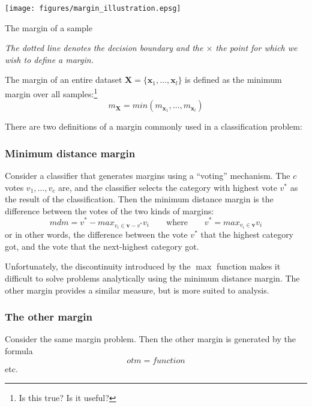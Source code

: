 \begin{linefigure}
\begin{center}
\texttt{[image: figures/margin\_illustration.epsg]}
\end{center}
\caption{The margin of a sample}
\emph{The dotted line denotes the decision boundary and the $\times$ the
point for which we wish to define a margin.}
\label{fig:margin illustration}
\end{linefigure}

The margin of an entire dataset $\mathbf{X} = \{ \mathbf{x}_1, \ldots,
\mathbf{x}_l \}$ is defined as the minimum margin over all
samples:\footnote{Is this true?  Is it useful?}
%
\begin{equation}
m_{\mathbf{X}} = min \left( m_{\mathbf{x}_1}, \ldots, m_{\mathbf{x}_l}
\right)
\label{eqn:dataset margin}
\end{equation}
%

There are two definitions of a margin commonly used in a
classification problem:

\subsubsection{Minimum distance margin}
Consider a classifier that generates margins using a ``voting''
mechanism.  The $c$ votes $v_1, \ldots, v_c$ are, and the classifier
selects the category with highest vote $v^{\ast}$ as the result of the
classification.   Then the minimum distance margin is the difference
between the votes of the two kinds of margins:
%
\begin{equation}
mdm = v^{\ast} - max_{v_i \in \mathbf{v} - v^{\ast}} v_i \qquad
\mbox{where} \qquad v^{\ast} = max_{v_i \in \mathbf{v}} v_i
\end{equation}
%
or in other words, the difference between the vote $v^{\ast}$ that the
highest category got, and  the vote that the next-highest category
got.

Unfortunately, the discontinuity introduced by the $\max$ function
makes it difficult to solve
problems analytically using the minimum distance margin.  The other
margin provides a similar measure, but is more suited to analysis.

\subsubsection{The other margin}
Consider the same margin problem.  Then the other margin is generated
by the formula
%
\begin{equation}
otm = function
\end{equation}
%
etc. 


